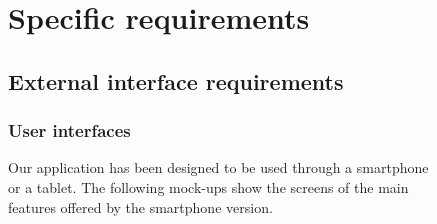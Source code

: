 \documentclass[12pt,titlepage]{article}
\begin{document}
\begin{figure}
\begin{flushleft}


\section{Specific requirements}\label{sec:crit}

\subsection{External interface requirements}\label{sec:mod1}
\subsubsection{User interfaces}\label{sec:mod1}
Our application has been designed to be used through a smartphone or a tablet.
The following mock-ups show the screens of the main features offered by the smartphone version. 
\end{flushleft}
\centering
{}

\end{figure}
\end{document}
